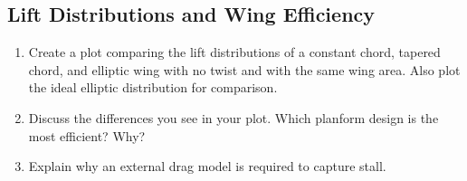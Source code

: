 \documentclass[11pt,twocolumn]{article}
\begin{document}
\subsection{Lift Distributions and Wing Efficiency}

\begin{enumerate}[label=\roman*.]
	\item Create a plot comparing the lift distributions of a constant chord, tapered chord, and elliptic wing with no twist and with the same wing area.  Also plot the ideal elliptic distribution for comparison.
	\item Discuss the differences you see in your plot.  Which planform design is the most efficient? Why?
	\item Explain why an external drag model is required to capture stall.
\end{enumerate}
\end{document}
